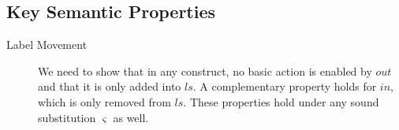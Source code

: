 \newpage
\subsection{Key Semantic Properties}

\begin{description}
  \item[Label Movement]
    We need to show that in any construct,
    no basic action is enabled by $out$
    and that it is only added into $ls$.
    A complementary property holds for $in$,
    which is only removed from $ls$.
    These properties hold under any sound substitution $\varsigma$ as well.
\end{description}
